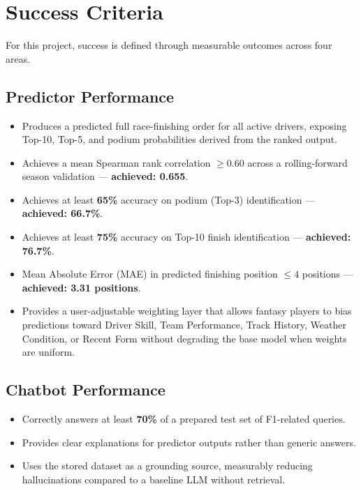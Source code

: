 \documentclass[12pt, a4paper, oneside]{report}
\begin{document}
\chapter{Success Criteria}

For this project, success is defined through measurable outcomes across four
areas.

\section{Predictor Performance}

\begin{itemize}[leftmargin=*]
  \item Produces a predicted full race-finishing order for all active drivers,
        exposing Top-10, Top-5, and podium probabilities derived from the ranked output.
  \item Achieves a mean Spearman rank correlation $\geq 0.60$ across a rolling-forward
        season validation --- \textbf{achieved: 0.655}.
  \item Achieves at least \textbf{65\%} accuracy on podium (Top-3) identification ---
        \textbf{achieved: 66.7\%}.
  \item Achieves at least \textbf{75\%} accuracy on Top-10 finish identification ---
        \textbf{achieved: 76.7\%}.
  \item Mean Absolute Error (MAE) in predicted finishing position $\leq 4$ positions ---
        \textbf{achieved: 3.31 positions}.
  \item Provides a user-adjustable weighting layer that allows fantasy players to
        bias predictions toward Driver Skill, Team Performance, Track History, Weather
        Condition, or Recent Form without degrading the base model when weights are uniform.
\end{itemize}

\section{Chatbot Performance}

\begin{itemize}[leftmargin=*]
  \item Correctly answers at least \textbf{70\%} of a prepared test set of
        F1-related queries.
  \item Provides clear explanations for predictor outputs rather than generic
        answers.
  \item Uses the stored dataset as a grounding source, measurably reducing
        hallucinations compared to a baseline LLM without retrieval.
\end{itemize}
\end{document}
